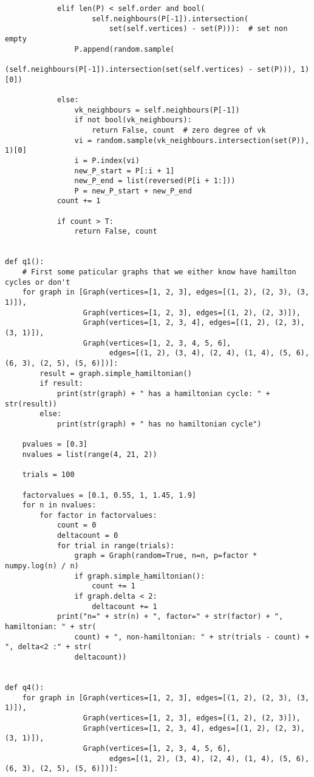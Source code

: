 \documentclass[10pt,a4paper]{report}
\begin{document}
\begin{verbatim}
            elif len(P) < self.order and bool(
                    self.neighbours(P[-1]).intersection(
                        set(self.vertices) - set(P))):  # set non empty
                P.append(random.sample(
                    (self.neighbours(P[-1]).intersection(set(self.vertices) - set(P))), 1)[0])

            else:
                vk_neighbours = self.neighbours(P[-1])
                if not bool(vk_neighbours):
                    return False, count  # zero degree of vk
                vi = random.sample(vk_neighbours.intersection(set(P)), 1)[0]
                i = P.index(vi)
                new_P_start = P[:i + 1]
                new_P_end = list(reversed(P[i + 1:]))
                P = new_P_start + new_P_end
            count += 1

            if count > T:
                return False, count


def q1():
    # First some paticular graphs that we either know have hamilton cycles or don't
    for graph in [Graph(vertices=[1, 2, 3], edges=[(1, 2), (2, 3), (3, 1)]),
                  Graph(vertices=[1, 2, 3], edges=[(1, 2), (2, 3)]),
                  Graph(vertices=[1, 2, 3, 4], edges=[(1, 2), (2, 3), (3, 1)]),
                  Graph(vertices=[1, 2, 3, 4, 5, 6],
                        edges=[(1, 2), (3, 4), (2, 4), (1, 4), (5, 6), (6, 3), (2, 5), (5, 6)])]:
        result = graph.simple_hamiltonian()
        if result:
            print(str(graph) + " has a hamiltonian cycle: " + str(result))
        else:
            print(str(graph) + " has no hamiltonian cycle")

    pvalues = [0.3]
    nvalues = list(range(4, 21, 2))

    trials = 100

    factorvalues = [0.1, 0.55, 1, 1.45, 1.9]
    for n in nvalues:
        for factor in factorvalues:
            count = 0
            deltacount = 0
            for trial in range(trials):
                graph = Graph(random=True, n=n, p=factor * numpy.log(n) / n)
                if graph.simple_hamiltonian():
                    count += 1
                if graph.delta < 2:
                    deltacount += 1
            print("n=" + str(n) + ", factor=" + str(factor) + ", hamiltonian: " + str(
                count) + ", non-hamiltonian: " + str(trials - count) + ", delta<2 :" + str(
                deltacount))


def q4():
    for graph in [Graph(vertices=[1, 2, 3], edges=[(1, 2), (2, 3), (3, 1)]),
                  Graph(vertices=[1, 2, 3], edges=[(1, 2), (2, 3)]),
                  Graph(vertices=[1, 2, 3, 4], edges=[(1, 2), (2, 3), (3, 1)]),
                  Graph(vertices=[1, 2, 3, 4, 5, 6],
                        edges=[(1, 2), (3, 4), (2, 4), (1, 4), (5, 6), (6, 3), (2, 5), (5, 6)])]:


\end{verbatim}
\end{document}
